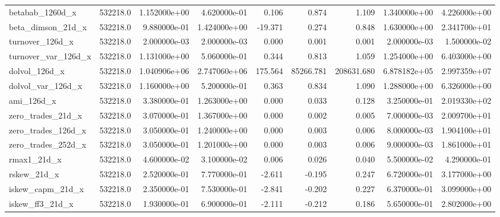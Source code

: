 \documentclass[12pt]{article}
\begin{document}
{\begin{landscape}
\begin{longtable}{|l|r|r|r|r|r|r|r|r|}
betabab\_1260d\_x        &  532218.0 &  1.152000e+00 &  4.620000e-01 &       0.106 &        0.874 &        1.109 &  1.340000e+00 &  4.226000e+00 \\
beta\_dimson\_21d\_x      &  532218.0 &  9.880000e-01 &  1.424000e+00 &     -19.371 &        0.274 &        0.848 &  1.630000e+00 &  2.341700e+01 \\
turnover\_126d\_x        &  532218.0 &  2.000000e-03 &  2.000000e-03 &       0.000 &        0.001 &        0.001 &  2.000000e-03 &  1.500000e-02 \\
turnover\_var\_126d\_x    &  532218.0 &  1.131000e+00 &  5.060000e-01 &       0.344 &        0.813 &        1.059 &  1.254000e+00 &  6.403000e+00 \\
dolvol\_126d\_x          &  532218.0 &  1.040906e+06 &  2.747060e+06 &     175.564 &    85266.781 &   208631.680 &  6.878182e+05 &  2.997359e+07 \\
dolvol\_var\_126d\_x      &  532218.0 &  1.160000e+00 &  5.200000e-01 &       0.363 &        0.834 &        1.090 &  1.288000e+00 &  6.326000e+00 \\
ami\_126d\_x             &  532218.0 &  3.380000e-01 &  1.263000e+00 &       0.000 &        0.033 &        0.128 &  3.250000e-01 &  2.019330e+02 \\
zero\_trades\_21d\_x      &  532218.0 &  3.070000e-01 &  1.367000e+00 &       0.000 &        0.002 &        0.005 &  7.000000e-03 &  2.009700e+01 \\
zero\_trades\_126d\_x     &  532218.0 &  3.050000e-01 &  1.240000e+00 &       0.000 &        0.003 &        0.006 &  8.000000e-03 &  1.904100e+01 \\
zero\_trades\_252d\_x     &  532218.0 &  3.050000e-01 &  1.201000e+00 &       0.000 &        0.003 &        0.006 &  9.000000e-03 &  1.861000e+01 \\
rmax1\_21d\_x            &  532218.0 &  4.600000e-02 &  3.100000e-02 &       0.006 &        0.026 &        0.040 &  5.500000e-02 &  4.290000e-01 \\
rskew\_21d\_x            &  532218.0 &  2.520000e-01 &  7.770000e-01 &      -2.611 &       -0.195 &        0.247 &  6.720000e-01 &  3.177000e+00 \\
iskew\_capm\_21d\_x       &  532218.0 &  2.350000e-01 &  7.530000e-01 &      -2.841 &       -0.202 &        0.227 &  6.370000e-01 &  3.099000e+00 \\
iskew\_ff3\_21d\_x        &  532218.0 &  1.930000e-01 &  6.900000e-01 &      -2.111 &       -0.212 &        0.186 &  5.650000e-01 &  2.802000e+00 \\

\end{longtable}
\end{landscape}}
\end{document}
